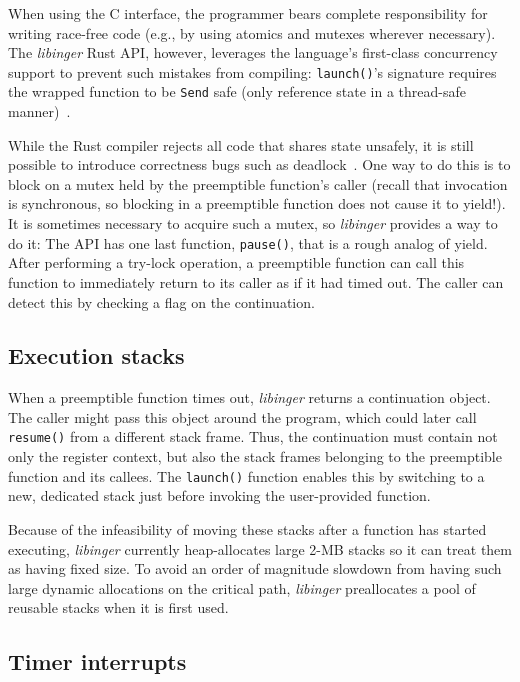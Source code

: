 When using the C interface, the programmer bears complete responsibility for writing
race-free code (e.g., by using atomics and mutexes wherever necessary).
The \textit{libinger} Rust API, however, leverages the
language's first-class concurrency support to prevent such mistakes from compiling:\@
\texttt{launch()}'s signature requires the wrapped function to be \texttt{Send} safe
(only reference state in a thread-safe manner)~\cite{www-rustlang-conc}.

While the Rust compiler rejects all code that shares state unsafely, it is still
possible to introduce
correctness bugs such as deadlock~\cite{www-rustlang-nu}.  One way to do this is to
block on a mutex held by
the preemptible function's caller (recall that invocation is synchronous, so blocking
in a preemptible function does not cause it to yield!).  It is sometimes necessary to
acquire such a mutex, so \textit{libinger} provides a way to do it:  The API has one
last function, \texttt{pause()}, that is a rough analog of yield.  After performing a
try-lock operation, a preemptible function can call this function to immediately
return to its caller as if it had timed out.  The caller can detect this by checking
a flag on the continuation.


\subsection{Execution stacks}

When a preemptible function times out, \textit{libinger} returns a
continuation object.  The caller might pass this object around the program, which
could later call \texttt{resume()} from a different stack frame.  Thus, the
continuation must contain not only the register context, but also the stack
frames belonging to the preemptible function and its callees.  The \texttt{launch()}
function enables this by switching to a new, dedicated stack just before invoking the
user-provided function.

Because of the infeasibility of moving these stacks after a function has started
executing, \textit{libinger} currently heap-allocates large 2-MB stacks so it can
treat them as having fixed size.  To avoid an order of magnitude slowdown from having
such large dynamic allocations on the critical path, \textit{libinger} preallocates a
pool of reusable stacks when it is first used.


\subsection{Timer interrupts}
\label{sec:libinger:signals}

